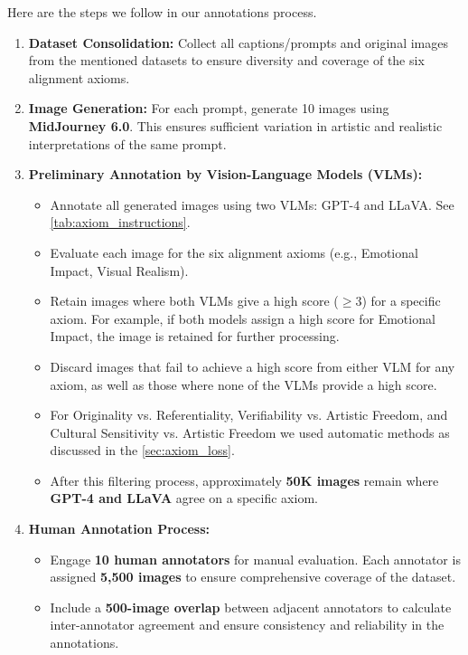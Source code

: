 Here are the steps we follow in our annotations process. 

\begin{enumerate}[label=\arabic*., leftmargin=1.5em]

    \item \textbf{Dataset Consolidation:}  
    Collect all captions/prompts and original images from the mentioned datasets to ensure diversity and coverage of the six alignment axioms.

    \item \textbf{Image Generation:}  
    For each prompt, generate 10 images using \textbf{MidJourney 6.0}. This ensures sufficient variation in artistic and realistic interpretations of the same prompt.

    \item \textbf{Preliminary Annotation by Vision-Language Models (VLMs):}
    \begin{itemize}
        \item Annotate all generated images using two VLMs: GPT-4 and LLaVA. See \cref{tab:axiom_instructions}.
        \item Evaluate each image for the six alignment axioms (e.g., Emotional Impact, Visual Realism).  
        \item Retain images where both VLMs give a high score (\(\geq 3\)) for a specific axiom. For example, if both models assign a high score for Emotional Impact, the image is retained for further processing.  
        \item Discard images that fail to achieve a high score from either VLM for any axiom, as well as those where none of the VLMs provide a high score.
        \item For Originality vs. Referentiality, Verifiability vs. Artistic Freedom, and Cultural Sensitivity vs. Artistic Freedom we used automatic methods as discussed in the \cref{sec:axiom_loss}.
        
        \item After this filtering process, approximately \textbf{50K images} remain where \textbf{GPT-4 and LLaVA} agree on a specific axiom.  
    \end{itemize}

    \item \textbf{Human Annotation Process:}  
    \begin{itemize}
        \item Engage \textbf{10 human annotators} for manual evaluation. Each annotator is assigned \textbf{5,500 images} to ensure comprehensive coverage of the dataset.  
        \item Include a \textbf{500-image overlap} between adjacent annotators to calculate inter-annotator agreement and ensure consistency and reliability in the annotations.  
    \end{itemize}


\end{enumerate}
